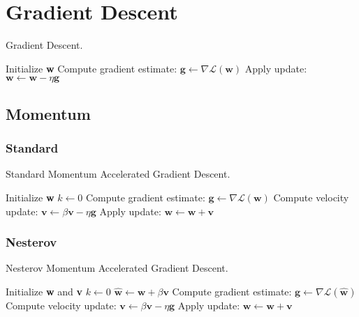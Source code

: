 \section{Gradient Descent}

\begin{algorithm}[h!]
	\caption{Gradient Descent.}
	\label{alg:gd}
	\begin{algorithmic}[1]
			\State Initialize \textbf{w}
				\State Compute gradient estimate: $\textbf{g} \gets \nabla \mathcal{L}(\textbf{w})$
				\State Apply update: $\textbf{w} \gets \textbf{w} - \eta \textbf{g}$
			\EndWhile
		\EndProcedure
	\end{algorithmic}
\end{algorithm}

\subsection{Momentum}



\subsubsection{Standard}

\begin{algorithm}[h!]
	\caption{Standard Momentum Accelerated Gradient Descent.}
	\label{alg:sgd}
	\begin{algorithmic}[1]
			\State Initialize \textbf{w}
			\State $k \gets 0$
				\State Compute gradient estimate: $\textbf{g} \gets \nabla \mathcal{L}(\textbf{w})$
				\State Compute velocity update: $\textbf{v} \gets \beta \textbf{v} - \eta \textbf{g}$
				\State Apply update: $\textbf{w} \gets \textbf{w} + \textbf{v}$
			\EndWhile
		\EndProcedure
	\end{algorithmic}
\end{algorithm}

\subsubsection{Nesterov}

\begin{algorithm}[h!]
	\caption{Nesterov Momentum Accelerated Gradient Descent.}
	\label{alg:ngd}
	\begin{algorithmic}[1]
			\State Initialize \textbf{w} and \textbf{v}
			\State $k \gets 0$
				\State $\hat{\textbf{w}} \gets \textbf{w} + \beta \textbf{v}$
				\State Compute gradient estimate: $\textbf{g} \gets \nabla \mathcal{L}(\hat{\textbf{w}})$
				\State Compute velocity update: $\textbf{v} \gets \beta \textbf{v} - \eta \textbf{g}$
				\State Apply update: $\textbf{w} \gets \textbf{w} + \textbf{v}$
			\EndWhile
		\EndProcedure
	\end{algorithmic}
\end{algorithm}